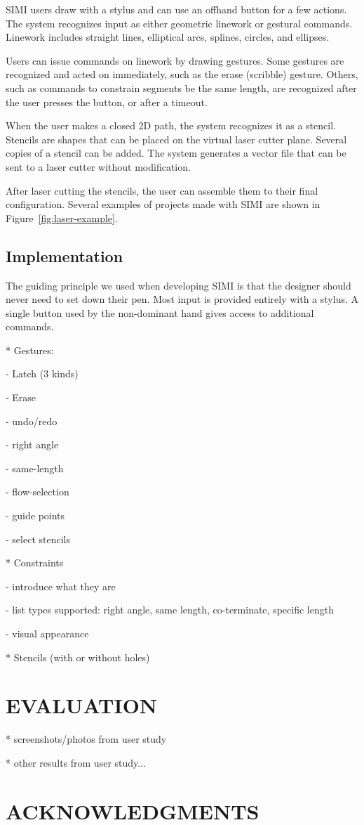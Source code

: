 \documentclass{article}
\begin{document}


SIMI users draw with a stylus and can use an offhand button for a few
actions. The system recognizes input as either geometric linework or
gestural commands. Linework includes straight lines, elliptical arcs,
splines, circles, and ellipses. 

Users can issue commands on linework by drawing gestures. Some
gestures are recognized and acted on immediately, such as the erase
(scribble) gesture. Others, such as commands to constrain segments be
the same length, are recognized after the user presses the button, or
after a timeout.

When the user makes a closed 2D path, the system recognizes it as a
stencil. Stencils are shapes that can be placed on the virtual laser
cutter plane. Several copies of a stencil can be added. The system
generates a vector file that can be sent to a laser cutter without
modification.

After laser cutting the stencils, the user can assemble them to their
final configuration. Several examples of projects made with SIMI are
shown in Figure~\ref{fig:laser-example}.

\subsection{Implementation}


The guiding principle we used when developing SIMI is that the
designer should never need to set down their pen. Most input is
provided entirely with a stylus. A single button used by the
non-dominant hand gives access to additional commands.

* Gestures:

  - Latch (3 kinds) 

  - Erase 

  - undo/redo

  - right angle

  - same-length 

  - flow-selection

  - guide points

  - select stencils

* Constraints

  - introduce what they are

  - list types supported: right angle, same length, co-terminate, specific length

  - visual appearance

* Stencils (with or without holes)

\section{EVALUATION}

* screenshots/photos from user study

* other results from user study...

\section{ACKNOWLEDGMENTS}



\end{document}
